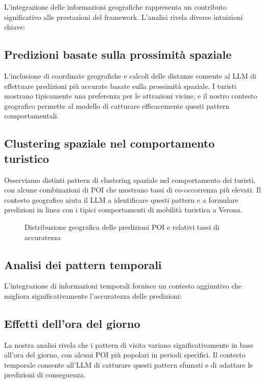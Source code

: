 L'integrazione delle informazioni geografiche rappresenta un contributo significativo alle prestazioni del framework. L'analisi rivela diverse intuizioni chiave:

\subsection{Predizioni basate sulla prossimità spaziale}

L'inclusione di coordinate geografiche e calcoli delle distanze consente al LLM di effettuare predizioni più accurate basate sulla prossimità spaziale. I turisti mostrano tipicamente una preferenza per le attrazioni vicine, e il nostro contesto geografico permette al modello di catturare efficacemente questi pattern comportamentali.

\subsection{Clustering spaziale nel comportamento turistico}

Osserviamo distinti pattern di clustering spaziale nel comportamento dei turisti, con alcune combinazioni di POI che mostrano tassi di co-occorrenza più elevati. Il contesto geografico aiuta il LLM a identificare questi pattern e a formulare predizioni in linea con i tipici comportamenti di mobilità turistica a Verona.

\begin{figure}[H]
\centering
\caption{Distribuzione geografica delle predizioni POI e relativi tassi di accuratezza}
\label{fig:geographical_analysis}
\end{figure}

\subsection{Analisi dei pattern temporali}

L'integrazione di informazioni temporali fornisce un contesto aggiuntivo che migliora significativamente l'accuratezza delle predizioni:

\subsection{Effetti dell'ora del giorno}

La nostra analisi rivela che i pattern di visita variano significativamente in base all'ora del giorno, con alcuni POI più popolari in periodi specifici. Il contesto temporale consente all'LLM di catturare questi pattern sfumati e di adattare le predizioni di conseguenza.

